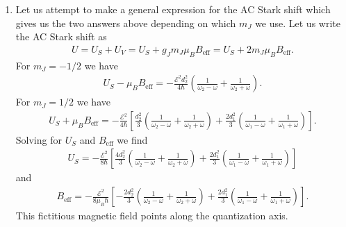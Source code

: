 \documentclass{article}
\theoremstyle{definition}
\newcommand{\f}[2]{\frac{#1}{#2}}
\newcommand{\lp}{\left(}
\newcommand{\rp}{\right)}
\newcommand{\lb}{\left[}
\newcommand{\rb}{\right]}
\begin{document}
\begin{enumerate}[label=(\alph*)]
\begin{enumerate}[label=(\roman*)]
		\item Let us attempt to make a general expression for the AC Stark shift which gives us the two answers above depending on which $m_J$ we use. Let us write the AC Stark shift as 
		\begin{align*}
		U = U_S + U_V = U_S + g_J m_J \mu_B B_\text{eff} = U_S + 2 m_J \mu_B B_\text{eff}.
		\end{align*}
		For $m_J = -1/2$ we have
		\begin{align*}
		U_S - \mu_B B_\text{eff} = -\f{\mathcal{E}^2d_2^2}{4\hbar} \lp\f{1}{\omega_2 - \omega} + \f{1}{\omega_2 + \omega} \rp.
		\end{align*}
		For $m_J = 1/2$ we have
		\begin{align*}
		U_S + \mu_B B_\text{eff} = -\f{\mathcal{E}^2}{4\hbar} \lb \f{d_2^2}{3}  \lp\f{1}{\omega_2 - \omega} + \f{1}{\omega_2 + \omega} \rp  + \f{2d_1^2}{3} \lp\f{1}{\omega_1 - \omega} + \f{1}{\omega_1 + \omega} \rp \rb.
		\end{align*}
		Solving for $U_S$ and $B_\text{eff}$ we find 
		\begin{align*}
		U_S = -\f{\mathcal{E}^2}{8\hbar} \lb \f{4d_2^2}{3}  \lp\f{1}{\omega_2 - \omega} + \f{1}{\omega_2 + \omega} \rp  + \f{2d_1^2}{3} \lp\f{1}{\omega_1 - \omega} + \f{1}{\omega_1 + \omega} \rp \rb
		\end{align*}
		and 
		\begin{align*}
		B_\text{eff} = -\f{\mathcal{E}^2}{8\mu_B\hbar} \lb -\f{2d_2^2}{3}  \lp\f{1}{\omega_2 - \omega} + \f{1}{\omega_2 + \omega} \rp  + \f{2d_1^2}{3} \lp\f{1}{\omega_1 - \omega} + \f{1}{\omega_1 + \omega} \rp \rb.
		\end{align*}
		This fictitious magnetic field points along the quantization axis. 
		
		
	\end{enumerate}
\end{enumerate}
	
	
\end{document}
